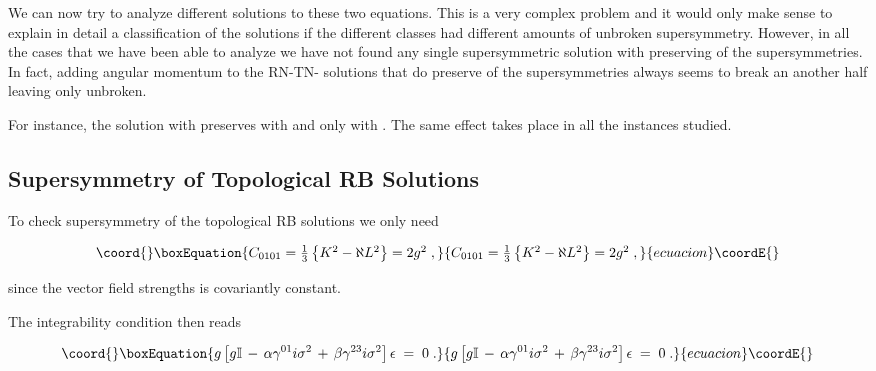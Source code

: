 \documentclass[12pt,a4paper]{article}
\begin{document}
We can now try to analyze different solutions to these two equations.
This is a very complex problem and it would only make sense to explain
in detail a classification of the solutions if the different classes
had different amounts of unbroken supersymmetry. However, in all the
cases that we have been able to analyze we have not found any single
supersymmetric solution with \coordHE{} preserving \coordHE{} of the
supersymmetries. In fact, adding angular momentum to the RN-TN-\coordHE{}
solutions that do preserve \coordHE{} of the supersymmetries always seems
to break an another half leaving only \coordHE{} unbroken.

For instance, the solution with \coordHE{} preserves \coordHE{} with
\coordHE{} and only \coordHE{} with \coordHE{}. The same effect takes place
in all the instances studied.






\subsection{Supersymmetry of Topological RB Solutions}
\label{sec-susy-RB}

To check supersymmetry of the topological RB solutions we only need

\begin{equation}\coord{}\boxEquation{
C_{0101} = 
\textstyle{\frac{1}{3}}\left\{K^{2}-\aleph L^{2}\right\}= 2g^{2} \; ,
}{
C_{0101} = 
\textstyle{\frac{1}{3}}\left\{K^{2}-\aleph L^{2}\right\}= 2g^{2} \; ,
}{ecuacion}\coordE{}\end{equation}

\noindent since the vector field strengths is covariantly constant.

The integrability condition then reads

\begin{equation}\coord{}\boxEquation{
g\left[
     g\mathbb{I} 
  \,-\,\alpha\gamma^{01}i\sigma^{2}
  \,+\,\beta \gamma^{23}i\sigma^{2}
\right] \epsilon \;=\; 0 \; .
}{
g\left[
     g\mathbb{I} 
  \,-\,\alpha\gamma^{01}i\sigma^{2}
  \,+\,\beta \gamma^{23}i\sigma^{2}
\right] \epsilon \;=\; 0 \; .
}{ecuacion}\coordE{}\end{equation}
\end{document}
